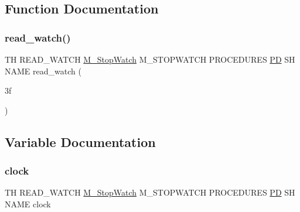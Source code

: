 \subsection{Function Documentation}
\mbox{\label{read__watch_83_8txt_a9a59c617348dee220b1c77cbc6d39050}} 
\subsubsection{\texorpdfstring{read\+\_\+watch()}{read\_watch()}}
{\footnotesize\ttfamily TH R\+E\+A\+D\+\_\+\+W\+A\+T\+CH \hyperlink{option__stopwatch_83_8txt_aa2011fc45a5e502e87ee50996a8a9305}{M\+\_\+\+Stop\+Watch} M\+\_\+\+S\+T\+O\+P\+W\+A\+T\+CH P\+R\+O\+C\+E\+D\+U\+R\+ES \hyperlink{what__overview_81_8txt_a85f26da5a4481fbdb0d9c79f2b94de3e}{PD} SH N\+A\+ME read\+\_\+watch (\begin{DoxyParamCaption}\item[{3f}]{ }\end{DoxyParamCaption})}



\subsection{Variable Documentation}
\mbox{\label{read__watch_83_8txt_a6b8c46608167c7c707dcc341e6a30f47}} 
\subsubsection{\texorpdfstring{clock}{clock}}
{\footnotesize\ttfamily TH R\+E\+A\+D\+\_\+\+W\+A\+T\+CH \hyperlink{option__stopwatch_83_8txt_aa2011fc45a5e502e87ee50996a8a9305}{M\+\_\+\+Stop\+Watch} M\+\_\+\+S\+T\+O\+P\+W\+A\+T\+CH P\+R\+O\+C\+E\+D\+U\+R\+ES \hyperlink{what__overview_81_8txt_a85f26da5a4481fbdb0d9c79f2b94de3e}{PD} SH N\+A\+ME clock}

\mbox{\label{read__watch_83_8txt_abdb62bde002f38ef75f810d3a905a823}} 
